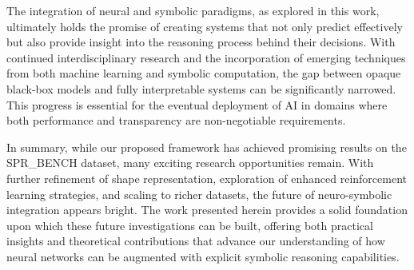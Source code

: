 \documentclass[11pt]{article}
\begin{document}
The integration of neural and symbolic paradigms, as explored in this work, ultimately holds the promise of creating systems that not only predict effectively but also provide insight into the reasoning process behind their decisions. With continued interdisciplinary research and the incorporation of emerging techniques from both machine learning and symbolic computation, the gap between opaque black-box models and fully interpretable systems can be significantly narrowed. This progress is essential for the eventual deployment of AI in domains where both performance and transparency are non-negotiable requirements.

In summary, while our proposed framework has achieved promising results on the SPR\_BENCH dataset, many exciting research opportunities remain. With further refinement of shape representation, exploration of enhanced reinforcement learning strategies, and scaling to richer datasets, the future of neuro-symbolic integration appears bright. The work presented herein provides a solid foundation upon which these future investigations can be built, offering both practical insights and theoretical contributions that advance our understanding of how neural networks can be augmented with explicit symbolic reasoning capabilities.
\end{document}
